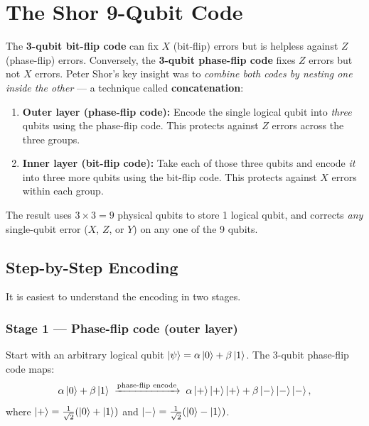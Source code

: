\documentclass[11pt, a4paper]{article}
\theoremstyle{definition}
\theoremstyle{plain}
\theoremstyle{remark}
\begin{document}
\newpage
\section{The Shor 9-Qubit Code}
\label{sec:shor}

\begin{intuition}
The \textbf{3-qubit bit-flip code} can fix $X$ (bit-flip) errors but is
helpless against $Z$ (phase-flip) errors.  Conversely, the \textbf{3-qubit
phase-flip code} fixes $Z$ errors but not $X$ errors.  Peter Shor's key
insight was to \emph{combine both codes by nesting one inside the other}
--- a technique called \textbf{concatenation}:

\begin{enumerate}
  \item \textbf{Outer layer (phase-flip code):} Encode the single logical
        qubit into \emph{three} qubits using the phase-flip code.  This
        protects against $Z$ errors across the three groups.
  \item \textbf{Inner layer (bit-flip code):} Take each of those three
        qubits and encode \emph{it} into three more qubits using the
        bit-flip code.  This protects against $X$ errors within each group.
\end{enumerate}
The result uses $3 \times 3 = 9$ physical qubits to store 1 logical qubit,
and corrects \emph{any} single-qubit error ($X$, $Z$, or $Y$) on any one
of the 9 qubits.
\end{intuition}

\subsection{Step-by-Step Encoding}
\label{sec:shor-encoding}

It is easiest to understand the encoding in two stages.

\subsubsection*{Stage 1 --- Phase-flip code (outer layer)}

Start with an arbitrary logical qubit
$\ket{\psi} = \alpha\ket{0} + \beta\ket{1}$.
The 3-qubit phase-flip code maps:
\[
  \alpha\ket{0} + \beta\ket{1}
  \;\xrightarrow{\text{phase-flip encode}}\;
  \alpha\ket{+}\ket{+}\ket{+} + \beta\ket{-}\ket{-}\ket{-},
\]
where $\ket{+} = \tfrac{1}{\sqrt{2}}(\ket{0}+\ket{1})$ and
$\ket{-} = \tfrac{1}{\sqrt{2}}(\ket{0}-\ket{1})$.
\end{document}
